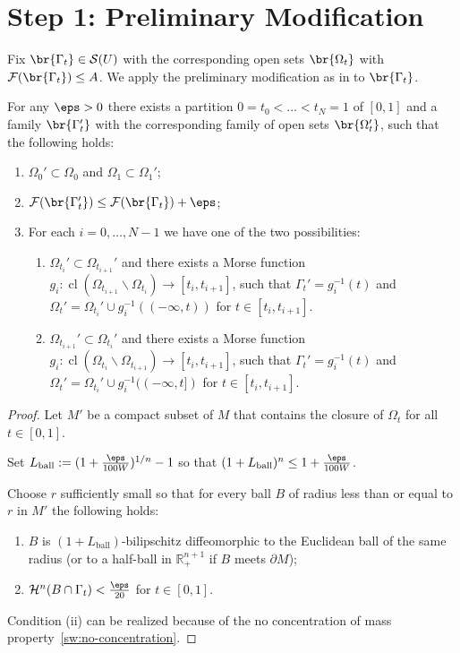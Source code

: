 \section{Step 1: Preliminary Modification}
Fix $\br{\Gamma_t} \in \mathcal{S}(U)$ with the corresponding open sets $\br{\Omega_t}$ with $\mathcal{F}(\br{\Gamma_t}) \leq A$. We apply the preliminary modification as in \cite[Lemma 6.2]{CL20} to $\br{\Gamma_t}$.
\begin{lemma}\label{lem:preliminary-modification}
    For any $\eps > 0$ there exists a partition $0 = t_0 < \dots < t_N = 1$ of $[0, 1]$ and a family $\br{\Gamma_t'}$ with the corresponding family of open sets $\br{\Omega_t'}$, such that the following holds:
    \begin{enumerate}
        \item[(1.1)] $\Omega_0' \subset \Omega_0$ and $\Omega_1 \subset \Omega_1'$;

        \item[(1.2)] $\mathcal{F}(\br{\Gamma_t'}) \leq \mathcal{F}(\br{\Gamma_t}) + \eps$;
        \item[(1.3)] For each $i = 0, \dots, N - 1$ we have one of the two possibilities:
        \begin{enumerate}
            \item[(A)] $\Omega_{t_i}' \subset \Omega_{t_{i + 1}}'$ and there exists a Morse function $g_i: \operatorname{cl}(\Omega_{t_{i + 1}}\backslash \Omega_{t_i}) \to [t_i, t_{i + 1}]$, such that $\Gamma_t' = g_i^{-1}(t)$ and $\Omega_t' = \Omega_{t_i}'\cup g_i^{-1}((-\infty, t))$ for $t \in [t_i, t_{i + 1}]$.
            \item[(B)] $\Omega_{t_{i + 1}}' \subset
             \Omega_{t_i}'$ and there exists a Morse function $g_i: \operatorname{cl}(\Omega_{t_i}\backslash\Omega_{t_{i + 1}}) \to [t_i, t_{i + 1}]$, such that $\Gamma_t' = g_i^{-1}(t)$ and $\Omega_t' = \Omega_{t_i}'\cup g_i^{-1}((-\infty, t])$ for $t \in [t_i, t_{i + 1}]$.
        \end{enumerate}
    \end{enumerate}
    \begin{proof}
        Let $M'$ be a compact subset of $M$ that contains the closure of $\Omega_t$ for all $t \in [0, 1]$.

        Set $L_{\mathrm{ball}}:=(1+\frac{\eps}{100W})^{1/n}-1$ so that $(1+L_{\mathrm{ball}})^n\le 1+\frac{\eps}{100W}$.

        Choose $r$ sufficiently small so that for every ball $B$ of radius less than or equal to $r$ in $M'$ the following holds:
        \begin{enumerate}
            \item[(i)] $B$ is $(1 + L_{\mathrm{ball}})$-bilipschitz diffeomorphic to the Euclidean ball of the same radius (or to a half-ball in $\mathbb{R}^{n+1}_+$ if $B$ meets $\partial M$);
            \item[(ii)] $\mathcal{H}^n(B\cap \Gamma_t) < \frac{\eps}{20}$ for $t \in [0, 1]$.
        \end{enumerate}
        Condition (ii) can be realized because of the no concentration of mass property~\ref{sw:no-concentration}.


\end{proof}
\end{lemma}
